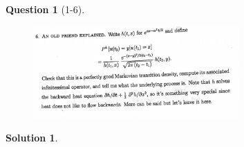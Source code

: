 \documentclass[11pt]{article}
\theoremstyle{plain}
\theoremstyle{quest}
\newtheorem*{question}{Question}
\newtheorem*{solution}{Solution}
\begin{document}
\newpage

\begin{question}[1-6]
\hfill
\begin{figure}[h!]
  \centering
    \includegraphics[width=0.7\textwidth]{limthm2-f-p6.png}
\end{figure}
\end{question}
\begin{solution} \hfill \\
\end{solution}
\end{document}

